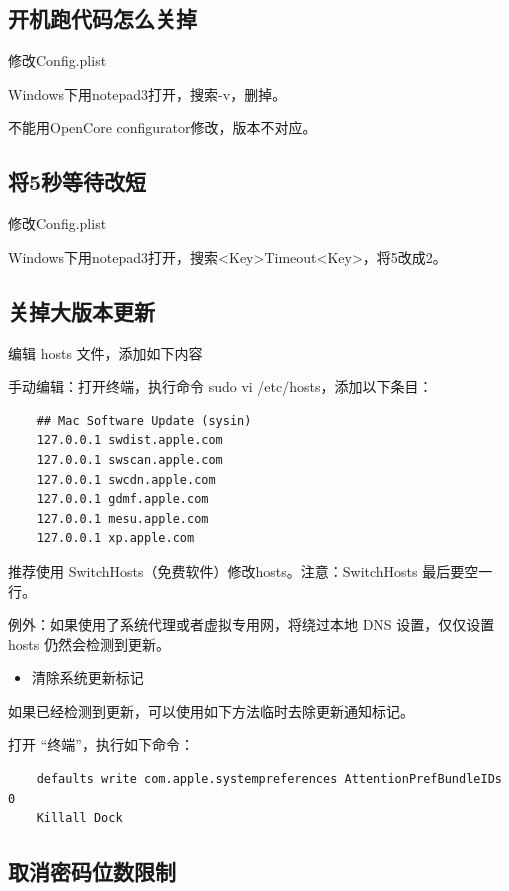 \documentclass[lang=cn,12pt,chinesefont=founder]{elegantbook}
\begin{document}
\subsection{开机跑代码怎么关掉}

修改Config.plist

Windows下用notepad3打开，搜索-v，删掉。

不能用OpenCore configurator修改，版本不对应。

\subsection{将5秒等待改短}

修改Config.plist

Windows下用notepad3打开，搜索<Key>Timeout<Key>，将5改成2。

\subsection{关掉大版本更新 }

编辑 hosts 文件，添加如下内容

手动编辑：打开终端，执行命令 sudo vi /etc/hosts，添加以下条目：

\begin{lstlisting}
    ## Mac Software Update (sysin)
    127.0.0.1 swdist.apple.com
    127.0.0.1 swscan.apple.com
    127.0.0.1 swcdn.apple.com
    127.0.0.1 gdmf.apple.com
    127.0.0.1 mesu.apple.com
    127.0.0.1 xp.apple.com
\end{lstlisting}

推荐使用 SwitchHosts（免费软件）修改hosts。注意：SwitchHosts 最后要空一行。

例外：如果使用了系统代理或者虚拟专用网，将绕过本地 DNS 设置，仅仅设置 hosts 仍然会检测到更新。

\begin{itemize}
  \item 清除系统更新标记
\end{itemize}

如果已经检测到更新，可以使用如下方法临时去除更新通知标记。

打开 “终端”，执行如下命令：

\begin{lstlisting}
    defaults write com.apple.systempreferences AttentionPrefBundleIDs 0
    Killall Dock
\end{lstlisting}

\subsection{取消密码位数限制}
\end{document}
